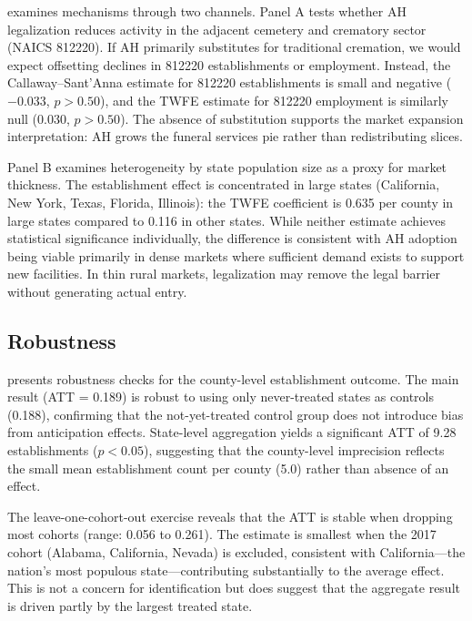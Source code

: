 \documentclass[12pt]{article}
\begin{document}


 examines mechanisms through two channels. Panel A tests whether AH legalization reduces activity in the adjacent cemetery and crematory sector (NAICS 812220). If AH primarily substitutes for traditional cremation, we would expect offsetting declines in 812220 establishments or employment. Instead, the Callaway--Sant'Anna estimate for 812220 establishments is small and negative ($-0.033$, $p > 0.50$), and the TWFE estimate for 812220 employment is similarly null (0.030, $p > 0.50$). The absence of substitution supports the market expansion interpretation: AH grows the funeral services pie rather than redistributing slices.

Panel B examines heterogeneity by state population size as a proxy for market thickness. The establishment effect is concentrated in large states (California, New York, Texas, Florida, Illinois): the TWFE coefficient is 0.635 per county in large states compared to 0.116 in other states. While neither estimate achieves statistical significance individually, the difference is consistent with AH adoption being viable primarily in dense markets where sufficient demand exists to support new facilities. In thin rural markets, legalization may remove the legal barrier without generating actual entry.


\subsection{Robustness}



 presents robustness checks for the county-level establishment outcome. The main result (ATT = 0.189) is robust to using only never-treated states as controls (0.188), confirming that the not-yet-treated control group does not introduce bias from anticipation effects. State-level aggregation yields a significant ATT of 9.28 establishments ($p < 0.05$), suggesting that the county-level imprecision reflects the small mean establishment count per county (5.0) rather than absence of an effect.

The leave-one-cohort-out exercise reveals that the ATT is stable when dropping most cohorts (range: 0.056 to 0.261). The estimate is smallest when the 2017 cohort (Alabama, California, Nevada) is excluded, consistent with California---the nation's most populous state---contributing substantially to the average effect. This is not a concern for identification but does suggest that the aggregate result is driven partly by the largest treated state.
\end{document}
